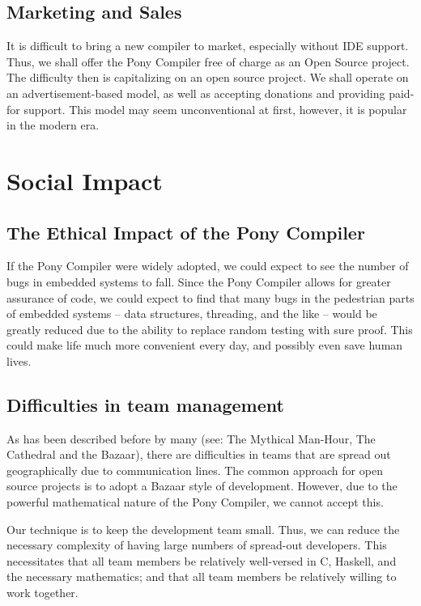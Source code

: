 \documentclass[11pt]{article}
\begin{document}
\subsection{Marketing and Sales}
\label{sec-1-4}


It is difficult to bring a new compiler to market, especially without IDE support. Thus, we shall offer the Pony Compiler free of charge as an Open Source project. The difficulty then is capitalizing on an open source project. We shall operate on an advertisement-based model, as well as accepting donations and providing paid-for support. This model may seem unconventional at first, however, it is popular in the modern era. 
\section{Social Impact}
\label{sec-2}
\subsection{The Ethical Impact of the Pony Compiler}
\label{sec-2-1}


If the Pony Compiler were widely adopted, we could expect to see the number of bugs in embedded systems to fall. Since the Pony Compiler allows for greater assurance of code, we could expect to find that many bugs in the pedestrian parts of embedded systems -- data structures, threading, and the like -- would be greatly reduced due to the ability to replace random testing with sure proof. This could make life much more convenient every day, and possibly even save human lives.
\subsection{Difficulties in team management}
\label{sec-2-2}


As has been described before by many (see: The Mythical Man-Hour, The Cathedral and the Bazaar), there are difficulties in teams that are spread out geographically due to communication lines. The common approach for open source projects is to adopt a Bazaar style of development. However, due to the powerful mathematical nature of the Pony Compiler, we cannot accept this.

Our technique is to keep the development team small. Thus, we can reduce the necessary complexity of having large numbers of spread-out developers. This necessitates that all team members be relatively well-versed in C, Haskell, and the necessary mathematics; and that all team members be relatively willing to work together. 
\end{document}
